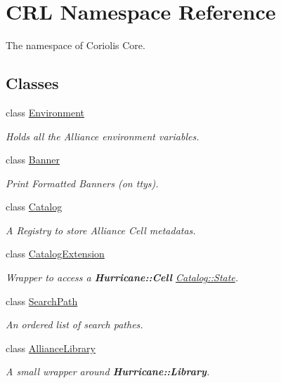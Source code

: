 \hypertarget{namespaceCRL}{\section{C\-R\-L Namespace Reference}
\label{namespaceCRL}
}


The namespace of Coriolis Core.  


\subsection*{Classes}
\begin{DoxyCompactItemize}
\item 
class \hyperlink{classCRL_1_1Environment}{Environment}
\begin{DoxyCompactList}\small\item\em Holds all the Alliance environment variables. \end{DoxyCompactList}\item 
class \hyperlink{classCRL_1_1Banner}{Banner}
\begin{DoxyCompactList}\small\item\em Print Formatted Banners (on ttys). \end{DoxyCompactList}\item 
class \hyperlink{classCRL_1_1Catalog}{Catalog}
\begin{DoxyCompactList}\small\item\em A Registry to store Alliance Cell metadatas. \end{DoxyCompactList}\item 
class \hyperlink{classCRL_1_1CatalogExtension}{Catalog\-Extension}
\begin{DoxyCompactList}\small\item\em Wrapper to access a {\bf Hurricane\-::\-Cell} \hyperlink{classCRL_1_1Catalog_1_1State}{Catalog\-::\-State}. \end{DoxyCompactList}\item 
class \hyperlink{classCRL_1_1SearchPath}{Search\-Path}
\begin{DoxyCompactList}\small\item\em An ordered list of search pathes. \end{DoxyCompactList}\item 
class \hyperlink{classCRL_1_1AllianceLibrary}{Alliance\-Library}
\begin{DoxyCompactList}\small\item\em A small wrapper around {\bf Hurricane\-::\-Library}. \end{DoxyCompactList}\item 

\end{DoxyCompactItemize}
